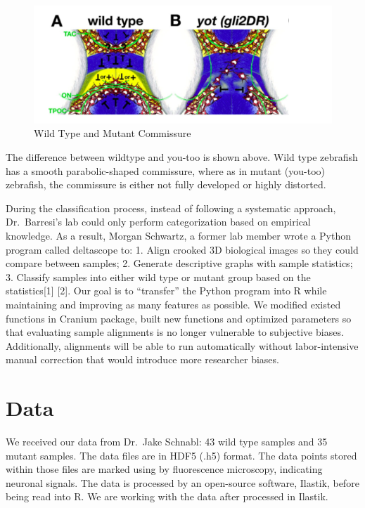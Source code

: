 \documentclass[10pt,letterpaper]{article}
\begin{document}
\begin{figure}
\includegraphics[width=0.9\linewidth]{visualization_paper/wt_yt} \caption{Wild Type and Mutant Commissure}\label{fig:Figure1}
\end{figure}

The difference between wildtype and you-too is shown above. Wild type
zebrafish has a smooth parabolic-shaped commissure, where as in mutant
(you-too) zebrafish, the commissure is either not fully developed or
highly distorted.

During the classification process, instead of following a systematic
approach, Dr.~Barresi's lab could only perform categorization based on
empirical knowledge. As a result, Morgan Schwartz, a former lab member
wrote a Python program called deltascope to: 1. Align crooked 3D
biological images so they could compare between samples; 2. Generate
descriptive graphs with sample statistics; 3. Classify samples into
either wild type or mutant group based on the statistics{[}1{]} {[}2{]}.
Our goal is to ``transfer'' the Python program into R while maintaining
and improving as many features as possible. We modified existed
functions in Cranium package, built new functions and optimized
parameters so that evaluating sample alignments is no longer vulnerable
to subjective biases. Additionally, alignments will be able to run
automatically without labor-intensive manual correction that would
introduce more researcher biases.

\hypertarget{data}{%
\section{Data}\label{data}}

We received our data from Dr.~Jake Schnabl: 43 wild type samples and 35
mutant samples. The data files are in HDF5 (.h5) format. The data points
stored within those files are marked using by fluorescence microscopy,
indicating neuronal signals. The data is processed by an open-source
software, Ilastik, before being read into R. We are working with the
data after processed in Ilastik.
\end{document}
